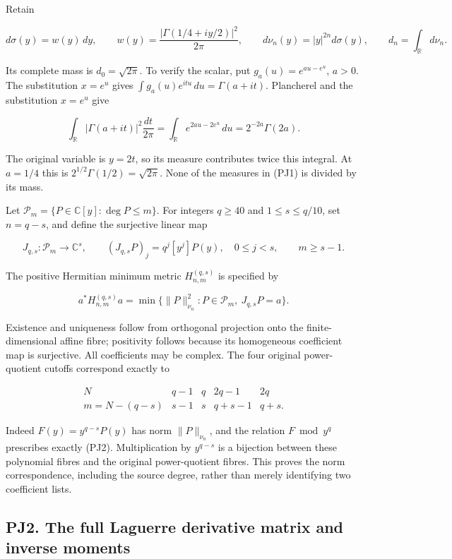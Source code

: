 \documentclass[10pt]{article}
\begin{document}
Retain

\[
d\sigma(y)=w(y)\,dy,\qquad
w(y)=\frac{|\Gamma(1/4+iy/2)|^2}{2\pi},\qquad
d\nu_n(y)=|y|^{2n}d\sigma(y),\qquad
d_n=\int_{\mathbb R}d\nu_n.
\tag{PJ1}
\]

Its complete mass is \(d_0=\sqrt{2\pi}\). To verify the scalar, put \(g_a(u)=e^{au-e^u}\), \(a>0\). The substitution \(x=e^u\) gives \(\int g_a(u)e^{itu}\,du=\Gamma(a+it)\). Plancherel and the substitution \(x=e^u\) give

\[
\int_{\mathbb R}|\Gamma(a+it)|^2\frac{dt}{2\pi}
=\int_{\mathbb R}e^{2au-2e^u}\,du=2^{-2a}\Gamma(2a).
\]

The original variable is \(y=2t\), so its measure contributes twice this integral. At \(a=1/4\) this is \(2^{1/2}\Gamma(1/2)=\sqrt{2\pi}\). None of the measures in (PJ1) is divided by its mass.

Let \(\mathcal P_m=\{P\in\mathbb C[y]:\deg P\le m\}\). For integers \(q\ge40\) and \(1\le s\le q/10\), set \(n=q-s\), and define the surjective linear map

\[
J_{q,s}:\mathcal P_m\longrightarrow\mathbb C^s,
\qquad (J_{q,s}P)_j=q^j[y^j]P(y),\quad0\le j<s,
\qquad m\ge s-1.
\tag{PJ2}
\]

The positive Hermitian minimum metric \(H_{n,m}^{(q,s)}\) is specified by

\[
a^*H_{n,m}^{(q,s)}a
=\min\{\|P\|_{\nu_n}^2:P\in\mathcal P_m,\ J_{q,s}P=a\}.
\tag{PJ3}
\]

Existence and uniqueness follow from orthogonal projection onto the finite-dimensional affine fibre; positivity follows because its homogeneous coefficient map is surjective. All coefficients may be complex. The four original power-quotient cutoffs correspond exactly to

\[
\begin{array}{c|cccc}
N&q-1&q&2q-1&2q\\ \hline
m=N-(q-s)&s-1&s&q+s-1&q+s.
\end{array}
\tag{PJ4}
\]

Indeed \(F(y)=y^{q-s}P(y)\) has norm \(\|P\|_{\nu_n}\), and the relation \(F\bmod y^q\) prescribes exactly (PJ2). Multiplication by \(y^{q-s}\) is a bijection between these polynomial fibres and the original power-quotient fibres. This proves the norm correspondence, including the source degree, rather than merely identifying two coefficient lists.

\subsection{PJ2. The full Laguerre derivative matrix and inverse moments}\label{pj2.-the-full-laguerre-derivative-matrix-and-inverse-moments}
\end{document}
